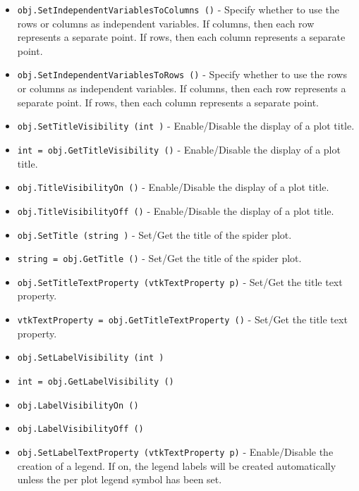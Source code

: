 \begin{itemize}
\item  \verb|obj.SetIndependentVariablesToColumns ()| -  Specify whether to use the rows or columns as independent variables.
 If columns, then each row represents a separate point. If rows, then 
 each column represents a separate point.

\item  \verb|obj.SetIndependentVariablesToRows ()| -  Specify whether to use the rows or columns as independent variables.
 If columns, then each row represents a separate point. If rows, then 
 each column represents a separate point.

\item  \verb|obj.SetTitleVisibility (int )| -  Enable/Disable the display of a plot title.

\item  \verb|int = obj.GetTitleVisibility ()| -  Enable/Disable the display of a plot title.

\item  \verb|obj.TitleVisibilityOn ()| -  Enable/Disable the display of a plot title.

\item  \verb|obj.TitleVisibilityOff ()| -  Enable/Disable the display of a plot title.

\item  \verb|obj.SetTitle (string )| -  Set/Get the title of the spider plot.

\item  \verb|string = obj.GetTitle ()| -  Set/Get the title of the spider plot.

\item  \verb|obj.SetTitleTextProperty (vtkTextProperty p)| -  Set/Get the title text property.

\item  \verb|vtkTextProperty = obj.GetTitleTextProperty ()| -  Set/Get the title text property.

\item  \verb|obj.SetLabelVisibility (int )|

\item  \verb|int = obj.GetLabelVisibility ()|

\item  \verb|obj.LabelVisibilityOn ()|

\item  \verb|obj.LabelVisibilityOff ()|

\item  \verb|obj.SetLabelTextProperty (vtkTextProperty p)| -  Enable/Disable the creation of a legend. If on, the legend labels will
 be created automatically unless the per plot legend symbol has been
 set.


\end{itemize}
